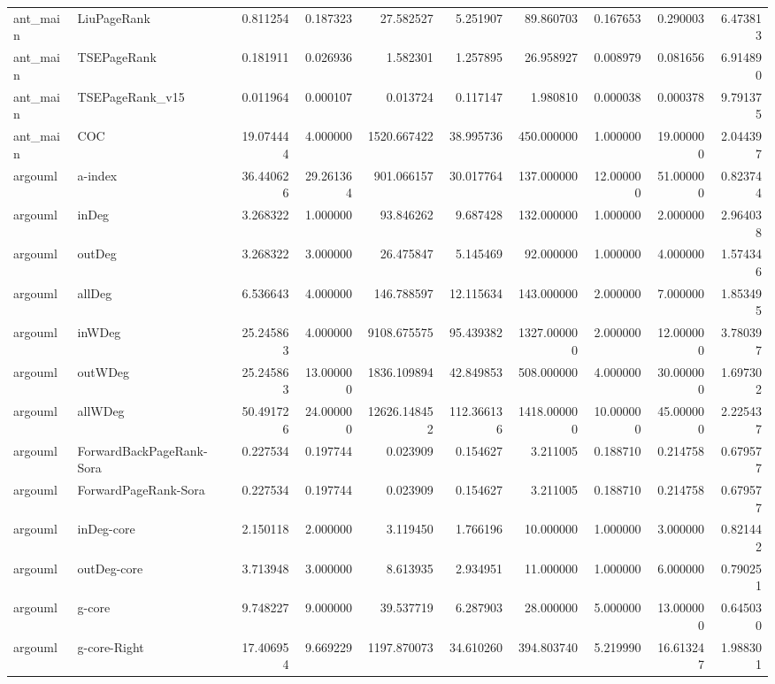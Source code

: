 \begin{tabular}{llrrrrrrrr}
ant_main & LiuPageRank & 0.811254 & 0.187323 & 27.582527 & 5.251907 & 89.860703 & 0.167653 & 0.290003 & 6.473813 \\
ant_main & TSEPageRank & 0.181911 & 0.026936 & 1.582301 & 1.257895 & 26.958927 & 0.008979 & 0.081656 & 6.914890 \\
ant_main & TSEPageRank_v15 & 0.011964 & 0.000107 & 0.013724 & 0.117147 & 1.980810 & 0.000038 & 0.000378 & 9.791375 \\
ant_main & COC & 19.074444 & 4.000000 & 1520.667422 & 38.995736 & 450.000000 & 1.000000 & 19.000000 & 2.044397 \\
argouml & a-index & 36.440626 & 29.261364 & 901.066157 & 30.017764 & 137.000000 & 12.000000 & 51.000000 & 0.823744 \\
argouml & inDeg & 3.268322 & 1.000000 & 93.846262 & 9.687428 & 132.000000 & 1.000000 & 2.000000 & 2.964038 \\
argouml & outDeg & 3.268322 & 3.000000 & 26.475847 & 5.145469 & 92.000000 & 1.000000 & 4.000000 & 1.574346 \\
argouml & allDeg & 6.536643 & 4.000000 & 146.788597 & 12.115634 & 143.000000 & 2.000000 & 7.000000 & 1.853495 \\
argouml & inWDeg & 25.245863 & 4.000000 & 9108.675575 & 95.439382 & 1327.000000 & 2.000000 & 12.000000 & 3.780397 \\
argouml & outWDeg & 25.245863 & 13.000000 & 1836.109894 & 42.849853 & 508.000000 & 4.000000 & 30.000000 & 1.697302 \\
argouml & allWDeg & 50.491726 & 24.000000 & 12626.148452 & 112.366136 & 1418.000000 & 10.000000 & 45.000000 & 2.225437 \\
argouml & ForwardBackPageRank-Sora & 0.227534 & 0.197744 & 0.023909 & 0.154627 & 3.211005 & 0.188710 & 0.214758 & 0.679577 \\
argouml & ForwardPageRank-Sora & 0.227534 & 0.197744 & 0.023909 & 0.154627 & 3.211005 & 0.188710 & 0.214758 & 0.679577 \\
argouml & inDeg-core & 2.150118 & 2.000000 & 3.119450 & 1.766196 & 10.000000 & 1.000000 & 3.000000 & 0.821442 \\
argouml & outDeg-core & 3.713948 & 3.000000 & 8.613935 & 2.934951 & 11.000000 & 1.000000 & 6.000000 & 0.790251 \\
argouml & g-core & 9.748227 & 9.000000 & 39.537719 & 6.287903 & 28.000000 & 5.000000 & 13.000000 & 0.645030 \\
argouml & g-core-Right & 17.406954 & 9.669229 & 1197.870073 & 34.610260 & 394.803740 & 5.219990 & 16.613247 & 1.988301 \\

\end{tabular}
